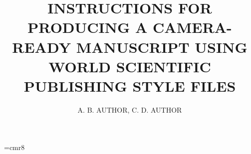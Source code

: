 

\font\eightrm=cmr8

%



\def\Journal#1#2#3#4{{#1} {\bf #2}, #3 (#4)}

\def\NCA{\em Nuovo Cimento}
\def\NIM{\em Nucl. Instrum. Methods}
\def\NIMA{{\em Nucl. Instrum. Methods} A}
\def\NPB{{\em Nucl. Phys.} B}
\def\PLB{{\em Phys. Lett.}  B}
\def\PRL{\em Phys. Rev. Lett.}
\def\PRD{{\em Phys. Rev.} D}
\def\ZPC{{\em Z. Phys.} C}

\def\st{\scriptstyle}
\def\sst{\scriptscriptstyle}
\def\mco{\multicolumn}
\def\epp{\epsilon^{\prime}}
\def\vep{\varepsilon}
\def\ra{\rightarrow}
\def\ppg{\pi^+\pi^-\gamma}
\def\vp{{\bf p}}
\def\ko{K^0}
\def\kb{\bar{K^0}}
\def\al{\alpha}
\def\ab{\bar{\alpha}}
\def\be{\begin{equation}}
\def\ee{\end{equation}}
\def\bea{\begin{eqnarray}}
\def\eea{\end{eqnarray}}
\def\CPbar{\hbox{{\rm CP}\hskip-1.80em{/}}}%




\title{INSTRUCTIONS FOR PRODUCING A CAMERA-READY MANUSCRIPT 
USING WORLD SCIENTIFIC PUBLISHING STYLE FILES}

\author{A. B. AUTHOR, C. D. AUTHOR}

\address{World Scientific Publishing Co, 1060 Main Street, 
River Edge,\\ NJ 07661, USA\\E-mail: wspc@wspc.com} 

